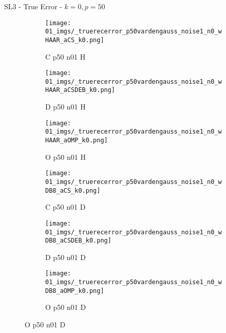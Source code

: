 \begin{frame}{SL3 - True Error - $k=0,p=50$}{}
\begin{figure}
\begin{subfigure}{0.13\textwidth}
\texttt{[image: 01\_imgs/\_truerecerror\_p50vardengauss\_noise1\_n0\_wHAAR\_aCS\_k0.png]}
\caption*{\tiny C p50 n01 H}
\end{subfigure}
\begin{subfigure}{0.13\textwidth}
\texttt{[image: 01\_imgs/\_truerecerror\_p50vardengauss\_noise1\_n0\_wHAAR\_aCSDEB\_k0.png]}
\caption*{\tiny D p50 n01 H}
\end{subfigure}
\begin{subfigure}{0.13\textwidth}
\texttt{[image: 01\_imgs/\_truerecerror\_p50vardengauss\_noise1\_n0\_wHAAR\_aOMP\_k0.png]}
\caption*{\tiny O p50 n01 H}
\end{subfigure}
\begin{subfigure}{0.13\textwidth}
\texttt{[image: 01\_imgs/\_truerecerror\_p50vardengauss\_noise1\_n0\_wDB8\_aCS\_k0.png]}
\caption*{\tiny C p50 n01 D}
\end{subfigure}
\begin{subfigure}{0.13\textwidth}
\texttt{[image: 01\_imgs/\_truerecerror\_p50vardengauss\_noise1\_n0\_wDB8\_aCSDEB\_k0.png]}
\caption*{\tiny D p50 n01 D}
\end{subfigure}
\begin{subfigure}{0.13\textwidth}
\texttt{[image: 01\_imgs/\_truerecerror\_p50vardengauss\_noise1\_n0\_wDB8\_aOMP\_k0.png]}
\caption*{\tiny O p50 n01 D}
\end{subfigure}

\vspace{5pt}


\end{figure}
\end{frame}
